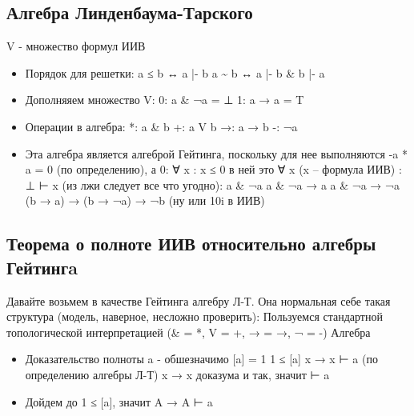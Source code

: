 \documentclass[11pt]{article}
\begin{document}
\subsection{Алгебра Линденбаума-Тарского}
\label{sec-5-6}
V - множество формул ИИВ
\begin{itemize}
\item Порядок для решетки:
a ≤ b ↔ a |- b
a \textasciitilde{} b ↔ a |- b \& b |- a
\item Дополняяем множество V:
0: a \& ¬a = ⊥
1: a → a = T
\item Операции в алгебра:
*: a \& b
+: a V b
→: a → b
-: ¬a
\item Эта алгебра является алгеброй Гейтинга, поскольку для нее
выполняются -a * a = 0 (по определению), а 0: ∀ x : x ≤ 0
в ней это ∀ x (x – формула ИИВ) : ⊥ ⊢ x (из лжи следует все что угодно):
a \& ¬a
a \& ¬a → a
a \& ¬a → ¬a
(b → a) → (b → ¬a) → ¬b (ну или 10i в ИИВ)
\end{itemize}
\subsection{Теорема о полноте ИИВ относительно алгебры Гейтингa}
\label{sec-5-7}
Давайте возьмем в качестве Гейтинга алгебру Л-Т. Она нормальная
себе такая структура (модель, наверное, несложно проверить):
Пользуемся стандартной топологической интерпретацией
(\& = *, V = +, → = →, ¬ = -)
Алгебра
\begin{itemize}
\item Доказательство полноты
a - обшезначимо
[a] = 1
1 ≤ [a]
x → x ⊢ a (по определению алгебры Л-Т)
x → x доказума и так, значит
⊢ a
\item Дойдем до 1 ≤ [a], значит A → A ⊢ a
\end{itemize}
\end{document}
